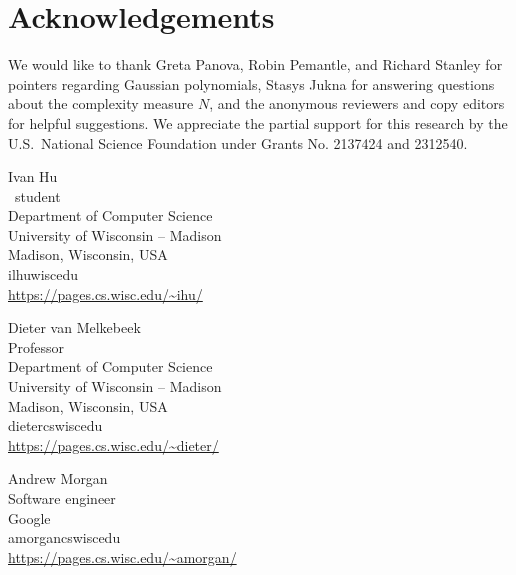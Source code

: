 \documentclass{toc}
\begin{document}
\section*{Acknowledgements}

We would like to thank Greta Panova, Robin Pemantle, and Richard Stanley for pointers regarding Gaussian polynomials, Stasys Jukna for answering questions about the complexity measure $N$, and the anonymous reviewers and copy editors for helpful suggestions. 
%
We appreciate the partial support for this research by the U.S.\ National Science Foundation under Grants No. 2137424 and 2312540. 
%
%

%


%
%
%
%
%
%

%
%

%
%
%
%
%
\begin{tocauthors}
\begin{tocinfo}[hu]
 Ivan Hu\\
 \phd\ student\\
 Department of Computer Science\\
 University of Wisconsin -- Madison\\
 Madison, Wisconsin, USA\\
 ilhu\tocat{}wisc\tocdot{}edu\\
 \url{https://pages.cs.wisc.edu/~ihu/}
\end{tocinfo}
\begin{tocinfo}[vanmelkebeek]
 Dieter van Melkebeek\\
 Professor\\
 Department of Computer Science\\
 University of Wisconsin -- Madison\\
 Madison, Wisconsin, USA\\
 dieter\tocat{}cs\tocdot{}wisc\tocdot{}edu \\   %
 \url{https://pages.cs.wisc.edu/~dieter/}      %
\end{tocinfo}
\begin{tocinfo}[morgan]
 Andrew Morgan\\
 Software engineer\\
 Google\\
 amorgan\tocat{}cs\tocdot{}wisc\tocdot{}edu\\
 \url{https://pages.cs.wisc.edu/~amorgan/} 
\end{tocinfo}
\end{tocauthors}
\end{document}
